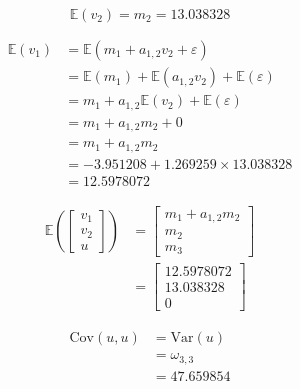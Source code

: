 \documentclass[
]{book}
\begin{document}
\begin{equation}
  \mathbb{E}
  \left(
    v_2
  \right)
  =
  m_2
  =
  13.038328
\end{equation}

\begin{equation}
  \begin{split}
    \mathbb{E}
    \left(
      v_1
    \right)
    &=
    \mathbb{E}
    \left(
      m_1 + a_{1, 2} v_2 + \varepsilon
    \right) \\
    &=
    \mathbb{E}
    \left(
      m_1
    \right)
    +
    \mathbb{E}
    \left(
      a_{1, 2} v_2
    \right)
    +
    \mathbb{E}
    \left(
      \varepsilon
    \right) \\
    &=
    m_1
    +
    a_{1, 2}
    \mathbb{E}
    \left(
      v_2
    \right)
    +
    \mathbb{E}
    \left(
      \varepsilon
    \right) \\
    &=
    m_1
    +
    a_{1, 2}
    m_2
    +
    0 \\
    &=
    m_1
    +
    a_{1, 2}
    m_2 \\
    &=
    -3.951208
    +
    1.269259
    \times
    13.038328 \\
    &=
    12.5978072
  \end{split}
\end{equation}

\begin{equation}
  \begin{split}
    \mathbb{E}
    \left(
      \begin{bmatrix}
        v_1 \\
        v_2 \\
        u
      \end{bmatrix}
    \right)
    &=
    \begin{bmatrix}
      m_1 + a_{1, 2} m_2 \\
      m_2 \\
      m_3
    \end{bmatrix} \\
    &=
    \begin{bmatrix}
      12.5978072 \\
      13.038328 \\
      0
    \end{bmatrix}
  \end{split}
\end{equation}

\begin{equation}
  \begin{split}
    \mathrm{Cov}
    \left(
      u,
      u 
    \right)
    &=
    \mathrm{Var}
    \left(
      u 
    \right) \\
    &=
    \omega_{3, 3} \\
    &=
    47.659854
  \end{split}
\end{equation}
\end{document}

